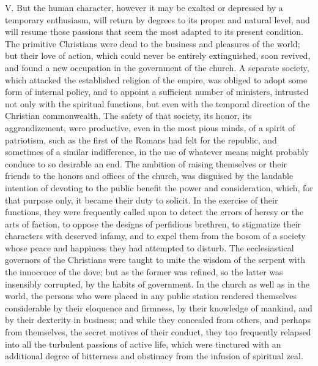 V. But the human character, however it may be exalted or
depressed by a temporary enthusiasm, will return by degrees to
its proper and natural level, and will resume those passions that
seem the most adapted to its present condition. The primitive
Christians were dead to the business and pleasures of the world;
but their love of action, which could never be entirely
extinguished, soon revived, and found a new occupation in the
government of the church. A separate society, which attacked the
established religion of the empire, was obliged to adopt some
form of internal policy, and to appoint a sufficient number of
ministers, intrusted not only with the spiritual functions, but
even with the temporal direction of the Christian commonwealth.
The safety of that society, its honor, its aggrandizement, were
productive, even in the most pious minds, of a spirit of
patriotism, such as the first of the Romans had felt for the
republic, and sometimes of a similar indifference, in the use of
whatever means might probably conduce to so desirable an end. The
ambition of raising themselves or their friends to the honors and
offices of the church, was disguised by the laudable intention of
devoting to the public benefit the power and consideration,
which, for that purpose only, it became their duty to solicit. In
the exercise of their functions, they were frequently called upon
to detect the errors of heresy or the arts of faction, to oppose
the designs of perfidious brethren, to stigmatize their
characters with deserved infamy, and to expel them from the bosom
of a society whose peace and happiness they had attempted to
disturb. The ecclesiastical governors of the Christians were
taught to unite the wisdom of the serpent with the innocence of
the dove; but as the former was refined, so the latter was
insensibly corrupted, by the habits of government. In the church
as well as in the world, the persons who were placed in any
public station rendered themselves considerable by their
eloquence and firmness, by their knowledge of mankind, and by
their dexterity in business; and while they concealed from
others, and perhaps from themselves, the secret motives of their
conduct, they too frequently relapsed into all the turbulent
passions of active life, which were tinctured with an additional
degree of bitterness and obstinacy from the infusion of spiritual
zeal.


